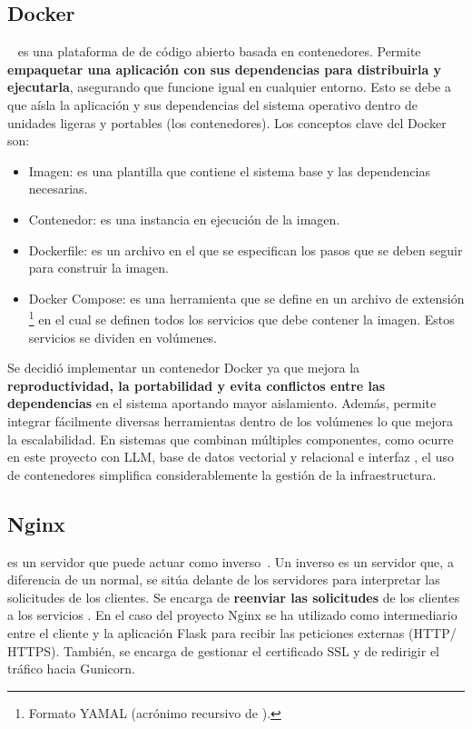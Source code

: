 
\subsection{Docker}\label{docker}
~\cite{herramienta:docker} es una plataforma de  de código abierto basada en contenedores. Permite \textbf{empaquetar una aplicación con sus dependencias para distribuirla y ejecutarla}, asegurando que funcione igual en cualquier entorno. Esto se debe a que aísla la aplicación y sus dependencias del sistema operativo dentro de unidades ligeras y portables (los contenedores). Los conceptos clave del Docker son:
\begin{itemize}
\tightlist
	\item Imagen: es una plantilla que contiene el sistema base y las dependencias necesarias.
	\item Contenedor: es una instancia en ejecución de la imagen.
	\item Dockerfile: es un archivo en el que se especifican los pasos que se deben seguir para construir la imagen.
	\item Docker Compose: es una herramienta que se define en un archivo de extensión \footnote{Formato YAMAL (acrónimo recursivo de ).} en el cual se definen todos los servicios que debe contener la imagen. Estos servicios se dividen en volúmenes. 
\end{itemize} 

Se decidió implementar un contenedor Docker ya que mejora la \textbf{reproductividad, la portabilidad y evita conflictos entre las dependencias} en el sistema aportando mayor aislamiento. Además, permite integrar fácilmente diversas herramientas dentro de los volúmenes lo que mejora la escalabilidad. En sistemas que combinan múltiples componentes, como ocurre en este proyecto con LLM, base de datos vectorial y relacional e interfaz , el uso de contenedores simplifica considerablemente la gestión de la infraestructura.

\subsection{Nginx}\label{nginx}
 es un servidor  que puede actuar como  inverso~\cite{herramienta:proxyinverso}. Un  inverso es un servidor que, a diferencia de un  normal, se sitúa delante de los servidores  para interpretar las solicitudes de los clientes. Se encarga de \textbf{reenviar las solicitudes} de los clientes a los servicios . En el caso del proyecto Nginx se ha utilizado como intermediario entre el cliente y la aplicación Flask para recibir las peticiones externas (HTTP/ HTTPS). También, se encarga de gestionar el certificado SSL y de redirigir el tráfico hacia Gunicorn. 

